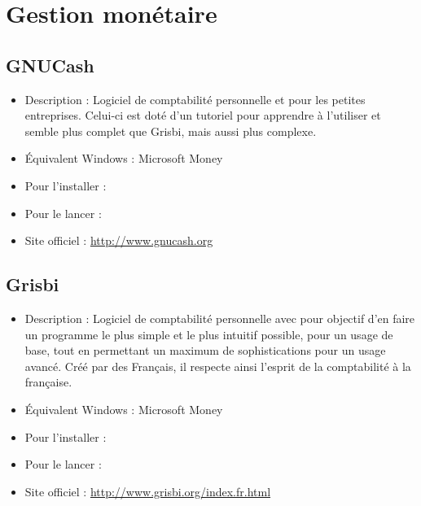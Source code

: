 \section{Gestion monétaire}
\subsection{GNUCash}
\begin{itemize}
\begingroup
{}
\item Description : Logiciel de comptabilité personnelle et pour les petites entreprises. Celui-ci est doté d'un tutoriel pour apprendre à l'utiliser et semble plus complet que Grisbi, mais aussi plus complexe.{\par}
\item Équivalent Windows : Microsoft Money{\par}
\item Pour l'installer : 
\item Pour le lancer : 
\item Site officiel : \url{http://www.gnucash.org}{\par}
\endgroup
\end{itemize}
\subsection{Grisbi}
\begin{itemize}
\begingroup
{}
\item Description : Logiciel de comptabilité personnelle avec pour objectif d'en faire un programme le plus simple et le plus intuitif possible, pour un usage de base, tout en permettant un maximum de sophistications pour un usage avancé. Créé par des Français, il respecte ainsi l'esprit de la comptabilité à la française.{\par}
\item Équivalent Windows : Microsoft Money{\par}
\item Pour l'installer : 
\item Pour le lancer : 
\item Site officiel : \url{http://www.grisbi.org/index.fr.html}{\par}
\endgroup
\end{itemize}
